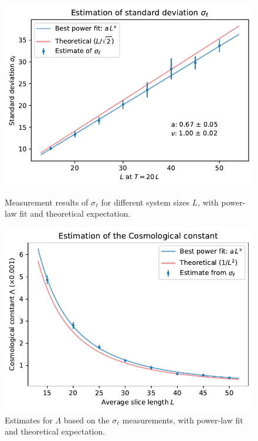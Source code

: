 \begin{figure}[ht]
    \begin{minipage}[t]{0.49\linewidth}
        \centering
        \includegraphics[width=\linewidth]{img/std_estimate.pdf}
        \caption{Measurement results of $\sigma_\ell$ for different system sizes $L$, with power-law fit and theoretical expectation.}
        \label{fig:std_estimate}
    \end{minipage}
    \hfill
    \begin{minipage}[t]{0.49\linewidth}
        \centering
        \includegraphics[width=\linewidth]{img/Lambda_estimate.pdf}
        \caption{Estimates for $\Lambda$ based on the $\sigma_\ell$ measurements, with power-law fit and theoretical expectation.}
        \label{fig:Lambda_estimate}
    \end{minipage}
\end{figure}

